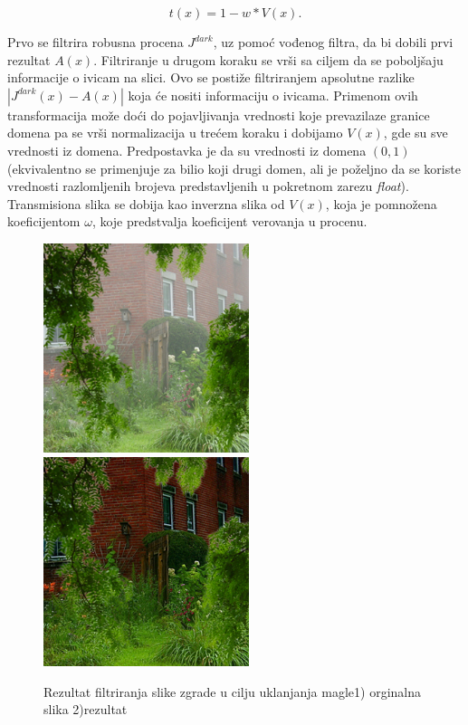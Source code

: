\documentclass[a4paper,12pt,titlepage]{article}
\begin{document}
\begin{equation}\label{eq:haze7}
t(x) = 1 - w * V(x).
\end{equation}

Prvo se filtrira robusna procena $J^{dark}$, uz pomoć vođenog filtra, da bi dobili prvi rezultat $A(x)$. Filtriranje u drugom koraku se vrši sa ciljem da se poboljšaju informacije o ivicam na slici. Ovo se postiže filtriranjem apsolutne razlike $|J^{dark}(x) - A(x)|$ koja će nositi informaciju o ivicama. Primenom ovih transformacija može doći do pojavljivanja vrednosti koje prevazilaze granice domena pa se vrši normalizacija u trećem koraku i dobijamo $V(x)$, gde su sve vrednosti iz domena. Predpostavka je da su vrednosti iz domena $(0, 1)$ (ekvivalentno se primenjuje za bilio koji drugi domen, ali je poželjno da se koriste vrednosti razlomljenih brojeva predstavljenih u pokretnom zarezu \emph{float}). Transmisiona slika se dobija kao inverzna slika od $V(x)$, koja je pomnožena koeficijentom $\omega$, koje predstvalja koeficijent verovanja u procenu.

\begin{figure}[ht!]
\centering
\includegraphics[width=60mm]{img/haze.png}
\includegraphics[width=60mm]{img/hazeRes.png}
\caption{Rezultat filtriranja slike zgrade u cilju uklanjanja magle1) orginalna slika 2)rezultat}
\label{dehaze}
\end{figure}   
\end{document}
